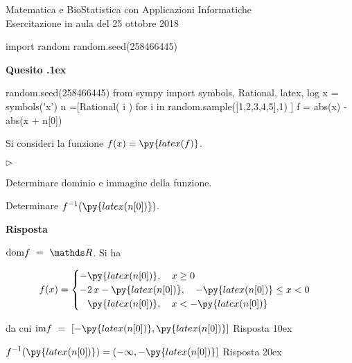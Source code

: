 \documentclass[11pt,twoside,a4paper]{article}
\newcommand{\mylabel}[1]{#1\hfill}
\renewenvironment{itemize}
  {\begin{list}{$\triangleright$}{%
   \setlength{\parskip}{0mm}
   \setlength{\topsep}{.4\baselineskip}
   \setlength{\rightmargin}{0mm}
   \setlength{\listparindent}{0mm}
   \setlength{\itemindent}{0mm}
   \setlength{\labelwidth}{2ex}
   \setlength{\itemsep}{.4\baselineskip}
   \setlength{\parsep}{0mm}
   \setlength{\partopsep}{0mm}
   \setlength{\labelsep}{1ex}
   \setlength{\leftmargin}{\labelwidth+\labelsep}
   \let\makelabel\mylabel}}{%
   \end{list}\vspace*{-1.3mm}}
\newcounter{quesito}
\newenvironment{question}{\addtocounter{quesito}{1}\par\textbf{Quesito \thequesito.\kern1ex}}{\vspace{0.5\parskip}}
\newenvironment{answer}{\par\textbf{Risposta\quad}}{\vspace{\parskip}}
\begin{document}
\colorbox{blue!10}{\begin{minipage}{\textwidth}
Matematica e BioStatistica con Applicazioni Informatiche\\
Esercitazione in aula del 25 ottobre 2018
\end{minipage}}

\bigskip


\begin{pycode}
import random
random.seed(258466445)
\end{pycode}
\begin{question}
\def\RR{{\mathds R}}
\def\dom{{\rm dom}}
\def\range{{\rm im}}
\begin{pycode}
random.seed(258466445)
from sympy import symbols, Rational, latex, log
x = symbols('x')
n =[Rational( i ) for i in random.sample([1,2,3,4,5],1) ]
f = abs(x) - abs(x + n[0])
\end{pycode}
Si consideri la funzione $\displaystyle f(x) = \py{latex(f)}$.
\begin{itemize}
\item[1.] Determinare dominio e immagine della funzione.
\item[2.] Determinare $f^{-1}(\py{latex(n[0])})$.
\end{itemize}

\begin{answer}

{\color{blue}
$\displaystyle \dom f \ =\ \RR$.} Si ha 

$$f(x) = \begin{cases} 
-\py{latex(n[0])}, \quad x \geq 0 
\cr 
- 2\, x - \py{latex(n[0])}, \quad - \py{latex(n[0])} \leq x < 0 
\cr 
\phantom{-}\py{latex(n[0])}, \quad x < -\py{latex(n[0])} \end{cases}$$ 

da cui {\color{blue} $\displaystyle \range f \ =\ [-\py{latex(n[0])}, \py{latex(n[0])}]$
\hfill Risposta 1\kern0ex}

{\color{blue}
$\displaystyle f^{-1}(\py{latex(n[0])}) = (-\infty, -\py{latex(n[0])}]$
\hfill Risposta 2\kern0ex}

\end{answer}
\end{question}
\end{document}
